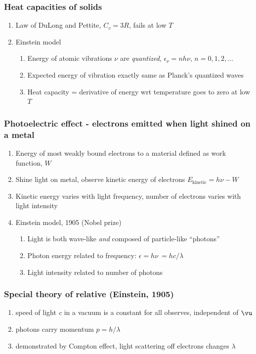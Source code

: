 \documentclass[11pt]{article}
\begin{document}
\subsubsection{Heat capacities of solids}
\label{sec:org8c3403b}
\begin{enumerate}
\item Law of DuLong and Pettite, \(C_v = 3R\), fails at low \(T\)
\item Einstein model
\begin{enumerate}
\item Energy of atomic vibrations \(\nu\) are \emph{quantized}, \(\epsilon_\nu=nh\nu\), \(n = 0,1,2, \ldots\)
\item Expected energy of vibration exactly same as Planck's quantized waves
\item Heat capacity = derivative of energy wrt temperature goes to zero at low \(T\)
\end{enumerate}
\end{enumerate}
\subsubsection{Photoelectric effect - electrons emitted when light shined on a metal}
\label{sec:org7195ba4}
\begin{enumerate}
\item Energy of most weakly bound electrons to a material defined as work function, \(W\)
\item Shine light on metal, observe kinetic energy of electrons \(E_\text{kinetic}=h\nu -W\)
\item Kinetic energy varies with light frequency, number of electrons varies with light intensity
\item Einstein model, 1905 (Nobel prize)
\begin{enumerate}
\item Light is both wave-like \emph{and} composed of particle-like ``photons''
\item Photon energy related to frequency: \(\epsilon = h \nu\ = hc/\lambda\)
\item Light intensity related to number of photons
\end{enumerate}
\end{enumerate}
\subsubsection{Special theory of relative (Einstein, 1905)}
\label{sec:org4d8bf4b}
\begin{enumerate}
\item speed of light \emph{c} in a vacuum is a constant for all observes, independent of \(\vu\)
\item photons carry momentum  \(p=h/\lambda\)
\item demonstrated by Compton effect, light scattering off electrons changes \(\lambda\)
\end{enumerate}
\end{document}
